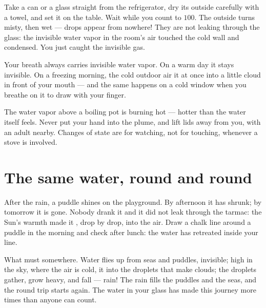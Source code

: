 \begin{example}\label{ex:g2:ice-water-steam:catch}
Take a can or a glass straight from the refrigerator, dry its
outside carefully with a towel, and set it on the table. Wait while
you count to $100$. The outside turns misty, then wet --- drops
appear from nowhere! They are not leaking through the glass: the
invisible water vapor in the room's air touched the cold wall and
condensed. You just caught the invisible gas.
\end{example}

\begin{example}\label{ex:g2:ice-water-steam:breath}
Your breath always carries invisible water vapor. On a warm day it
stays invisible. On a freezing morning, the cold outdoor air
 it at once into a little cloud in front of your mouth ---
and the same happens on a cold window when you breathe on it to draw
with your finger.
\end{example}

\begin{remark}\label{rem:g2:ice-water-steam:safety}
The water vapor above a boiling pot is burning hot --- hotter than
the water itself feels. Never put your hand into the plume, and lift
lids away from you, with an adult nearby. Changes of state are for
watching, not for touching, whenever a stove is involved.
\end{remark}

\section{The same water, round and round}

\begin{example}\label{ex:g2:ice-water-steam:puddle}
After the rain, a puddle shines on the playground. By afternoon it
has shrunk; by tomorrow it is gone. Nobody drank it and it did not
leak through the tarmac: the Sun's warmth made it , drop by
drop, into the air. Draw a chalk line around a puddle in the morning
and check after lunch: the water has retreated inside your line.
\end{example}

\begin{example}\label{ex:g2:ice-water-steam:cycle}
What  must  somewhere. Water flies up from seas
and puddles, invisible; high in the sky, where the air is cold, it
 into the droplets that make clouds; the droplets gather,
grow heavy, and fall --- rain! The rain fills the puddles and the
seas, and the round trip starts again. The water in your glass has
made this journey more times than anyone can count.
\end{example}

